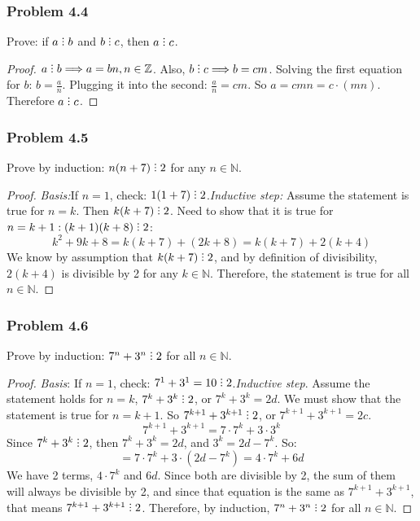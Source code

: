 \documentclass[hidelinks,12pt]{article}
\newcommand{\N}{\mathbb{N}}
\newcommand{\Z}{\mathbb{Z}}
\newcommand{\divby}{%
  \mathrel{\text{\vbox{\baselineskip.65ex\lineskiplimit0pt\hbox{.}\hbox{.}\hbox{.}}}}%
  }
\begin{document}
\subsubsection{Problem 4.4}
Prove: if $a\divby b$ and $b\divby c$, then $a\divby c$.
\begin{proof}
$a\divby b \Longrightarrow a=bn, n\in \Z$. Also, $b\divby c \Longrightarrow b=cm$. Solving the first equation for $b$: $b=\frac{a}{n}$. Plugging it into the second: $\frac{a}{n}=cm$. So $a=cmn=c\cdot (mn)$. Therefore $a\divby c$.
\end{proof}

\subsubsection{Problem 4.5}
Prove by induction: $n(n+7)\divby2$ for any $n\in\N$.
\begin{proof}
\emph{Basis:}If $n=1$, check: $1(1+7)\divby2$.\newline \emph{Inductive step:} Assume the statement is true for $n=k$. Then $k(k+7)\divby2$. Need to show that it is true for $n=k+1: (k+1)(k+8)\divby2$:$$k^{2}+9k+8=k(k+7)+(2k+8)=k(k+7)+2(k+4)$$ We know by assumption that $k(k+7)\divby2$, and by definition of divisibility, $2(k+4)$ is divisible by 2 for any $k\in\N$. Therefore, the statement is true for all $n\in\N$.
\end{proof}
\subsubsection{Problem 4.6}
Prove by induction: $7^{n}+3^{n}\divby2$ for all $n\in\N$.
\begin{proof}
\emph{Basis}: If $n=1$, check: $7^{1}+3^{1}=10\divby2$.\newline \emph{Inductive step}. Assume the statement holds for $n=k$, $7^{k}+3^{k}\divby2$, or $7^{k}+3^{k}=2d$. We must show that the statement is true for $n=k+1$. So $7^{k+1}+3^{k+1}\divby2$, or $7^{k+1}+3^{k+1}=2c$. $$7^{k+1}+3^{k+1}=7\cdot7^{k}+3\cdot3^{k}$$ Since $7^{k}+3^{k}\divby2$, then $7^{k}+3^{k}=2d$, and $3^{k}=2d-7^{k}$. So:$$=7\cdot7^{k}+3\cdot(2d-7^{k})=4\cdot7^{k}+6d$$ We have 2 terms, $4\cdot7^{k}$ and $6d$. Since both are divisible by 2, the sum of them will always be divisible by 2, and since that equation is the same as $7^{k+1}+3^{k+1}$, that means $7^{k+1}+3^{k+1}\divby2$. Therefore, by induction, $7^{n}+3^{n}\divby2$ for all $n\in\N$.
\end{proof}
\end{document}
